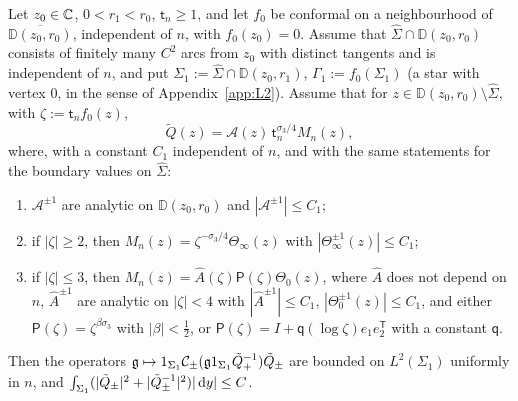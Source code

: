 \begin{lemma}\label{lem:edge-block}
Let $z_0\in\mathbb{C}$, $0<r_1<r_0$, $\mathsf t_n\ge1$, and let $f_0$ be conformal on a neighbourhood of $\overline{\mathbb D(z_0,r_0)}$,
independent of $n$, with $f_0(z_0)=0$. Assume that $\hat\Sigma\cap \mathbb D(z_0,r_0)$ consists of finitely many $C^2$ arcs from
$z_0$ with distinct tangents and is independent of $n$, and put $\Sigma_1:=\hat\Sigma\cap \mathbb D(z_0,r_1)$,
$\Gamma_1:=f_0(\Sigma_1)$ (a star with vertex $0$, in the sense of Appendix~\ref{app:L2}). Assume that for $z\in
\mathbb D(z_0,r_0)\setminus\hat\Sigma$, with $\zeta:=\mathsf t_nf_0(z)$,
\[
  \tilde Q(z)=\mathcal A(z)\,\mathsf t_n^{\sigma_3/4}M_n(z),
\]
where, with a constant $C_1$ independent of $n$, and with the same statements for the boundary values on $\hat\Sigma$:
\begin{enumerate}
\item[(B1)] $\mathcal A^{\pm1}$ are analytic on $\mathbb D(z_0,r_0)$ and $|\mathcal A^{\pm1}|\le C_1$;
\item[(B2)] if $|\zeta|\ge2$, then $M_n(z)=\zeta^{-\sigma_3/4}\Theta_\infty(z)$ with $|\Theta_\infty^{\pm1}(z)|\le C_1$;
\item[(B3)] if $|\zeta|\le3$, then $M_n(z)=\hat A(\zeta)\mathsf P(\zeta)\Theta_0(z)$, where $\hat A$ does not depend on $n$,
  $\hat A^{\pm1}$ are analytic on $|\zeta|<4$ with $|\hat A^{\pm1}|\le C_1$, $|\Theta_0^{\pm1}(z)|\le C_1$, and either
  $\mathsf P(\zeta)=\zeta^{\beta\sigma_3}$ with $|\beta|<\frac12$, or $\mathsf P(\zeta)=I+\mathsf q(\log\zeta)e_1e_2^{\mathsf T}$ with
  a constant $\mathsf q$.
\end{enumerate}
Then the operators $\mathfrak g\mapsto1_{\Sigma_1}\mathcal{C}_\pm(\mathfrak g1_{\Sigma_1}\tilde Q_+^{-1})\tilde Q_\pm$ are bounded on
$L^2(\Sigma_1)$ uniformly in $n$, and $\int_{\Sigma_1}(|\tilde Q_\pm|^2+|\tilde Q_\pm^{-1}|^2)|\,\mathrm{d} y|\le C$.
\end{lemma}

